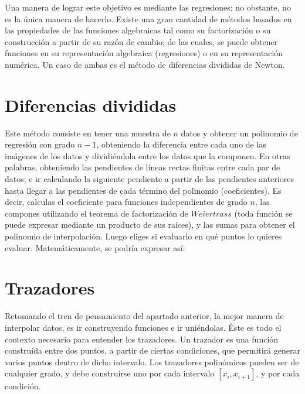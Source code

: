 \documentclass[12pt,oneside,FLEQN]{report}
\begin{document}
{Una manera de lograr este objetivo es mediante las regresiones; no obstante, no es la única manera de hacerlo. Existe una gran cantidad de métodos basados en las propiedades de las funciones algebraicas tal como su factorización o su construcción a partir de su razón de cambio; de las cuales, se puede obtener funciones en su representación algebraica (regresiones) o en su representación numérica. Un caso de ambas es el método de diferencias divididas de Newton.\\

\section{Diferencias divididas}
Este método consiste en tener una muestra de $n$ datos y obtener un polinomio de regresión con grado $n-1$, obteniendo la diferencia entre cada uno de las imágenes de los datos y dividiéndola entre los datos que la componen. En otras palabras, obteniendo las pendientes de líneas rectas finitas entre cada par de datos; e ir calculando la siguiente pendiente a partir de las pendientes anteriores hasta llegar a las pendientes de cada término del polinomio (coeficientes). Es decir, calculas el coeficiente para funciones independientes de grado $n$, las compones utilizando el teorema de factorización de $Weiertrass$ (toda función se puede expresar mediante un producto de sus raíces), y las sumas para obtener el polinomio de interpolación. Luego eliges si evaluarlo en qué puntos lo quieres evaluar. Matemáticamente, se podría expresar así:
\section{Trazadores}
Retomando el tren de pensamiento del apartado anterior, la mejor manera de interpolar datos, es ir construyendo funciones e ir uniéndolas. Éste es todo el contexto necesario para entender los trazadores. Un trazador es una función construída entre dos puntos, a partir de ciertas condiciones, que permitirá generar varios puntos dentro de dicho intervalo. Los trazadores polinómicos pueden ser de cualquier grado, y debe construirse uno por cada intervalo $[x_{i},x_{i+1}]$, y por cada condición.\\

}
\end{document}
